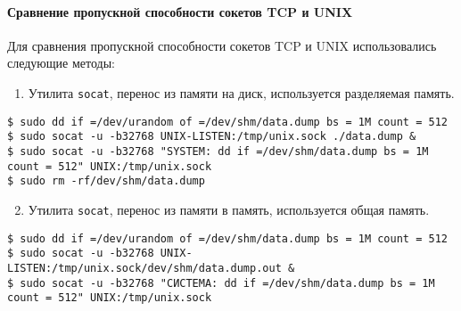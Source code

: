
\paragraph{Сравнение пропускной способности сокетов TCP и UNIX}
Для сравнения пропускной способности сокетов TCP и UNIX использовались следующие методы:

\begin{enumerate}
\setcounter{enumi}{0}
\item Утилита \texttt{socat}, перенос из памяти на диск, используется разделяемая память.
\end{enumerate}

\noindent
\begin{lstlisting}
$ sudo dd if =/dev/urandom of =/dev/shm/data.dump bs = 1M count = 512
$ sudo socat -u -b32768 UNIX-LISTEN:/tmp/unix.sock ./data.dump &
$ sudo socat -u -b32768 "SYSTEM: dd if =/dev/shm/data.dump bs = 1M count = 512" UNIX:/tmp/unix.sock
$ sudo rm -rf/dev/shm/data.dump
\end{lstlisting}

\begin{enumerate}
\setcounter{enumi}{1}
\item Утилита \texttt{socat}, перенос из памяти в память, используется общая память.
\end{enumerate}

\noindent
\begin{lstlisting}
$ sudo dd if =/dev/urandom of =/dev/shm/data.dump bs = 1M count = 512
$ sudo socat -u -b32768 UNIX-LISTEN:/tmp/unix.sock/dev/shm/data.dump.out &
$ sudo socat -u -b32768 "СИСТЕМА: dd if =/dev/shm/data.dump bs = 1M count = 512" UNIX:/tmp/unix.sock
\end{lstlisting}


